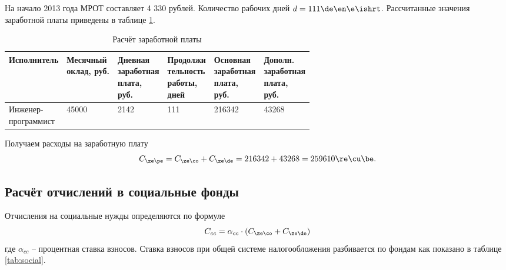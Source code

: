 На начало 2013 года МРОТ составляет 4 330 рублей. Количество рабочих дней $d = 111 \de\en\e\ishrt$. Рассчитанные значения заработной платы приведены в таблице \ref{tab:salary}.

\begin{table}[H]
    \caption{\label{tab:salary}Расчёт заработной платы}
    \begin{tabular}[H]{|l|l|l|l|l|l|}
        \hline
        Исполнитель & \specialcell{Месячный\\оклад, руб.} & \specialcell{Дневная\\заработная\\плата,\\руб.} & \specialcell{Продолжи\\тельность\\работы,\\дней} & \specialcell{Основная\\заработная\\плата,\\руб.} & \specialcell{Дополн.\\заработная\\плата,\\руб.} \\
        \hline
        \specialcell{Инженер-\\программист} & 45000 & 2142 & 111 & 216342 & 43268\\
        \hline
    \end{tabular}
\end{table}

Получаем расходы на заработную плату
\begin{equation*}
    C_{\ze\pe} = C_{\ze\co} + C_{\ze\de} = 216342 + 43268 = 259610 \re\cu\be.
\end{equation*}

\subsection{Расчёт отчислений в социальные фонды}
Отчисления на социальные нужды определяются по формуле
\begin{equation*}
    C_{cc} = \alpha_{cc} \cdot (C_{\ze\co} + C_{\ze\de})
\end{equation*}
где $\alpha_{cc}$ -- процентная ставка взносов. Ставка взносов при общей системе налогообложения разбивается по фондам как показано в таблице \ref{tab:social}.

